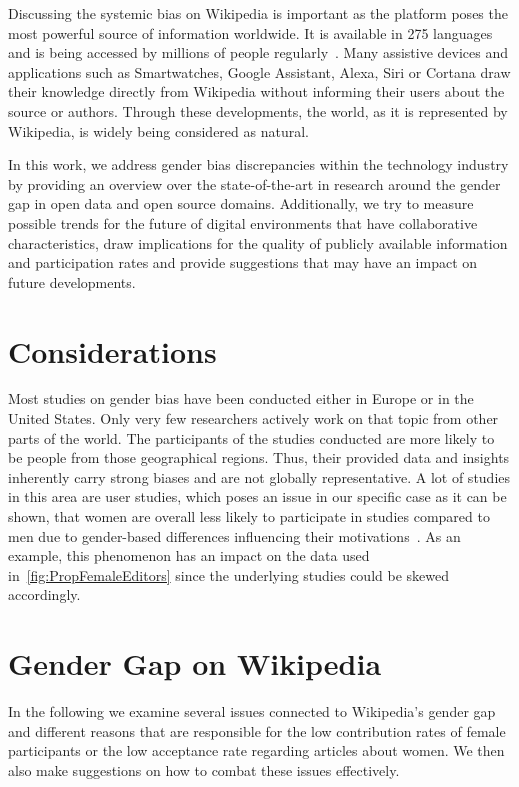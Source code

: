 \documentclass[a4paper, 11pt]{article}
\begin{document}
Discussing the systemic bias on Wikipedia is important as the platform poses the most powerful source of information worldwide. It is available in 275 languages and is being accessed by millions of people regularly~\cite{zachte2018}. Many assistive devices and applications such as Smartwatches, Google Assistant, Alexa, Siri or Cortana draw their knowledge directly from Wikipedia without informing their users about the source or authors. Through these developments, the world, as it is represented by Wikipedia, is widely being considered as natural.

In this work, we address gender bias discrepancies within the technology industry by providing an overview over the state-of-the-art in research around the gender gap in open data and open source domains. Additionally, we try to measure possible trends for the future of digital environments that have collaborative characteristics, draw implications for the quality of publicly available information and participation rates and provide suggestions that may have an impact on future developments.

\section{Considerations} \label{sec:considerations}
Most studies on gender bias have been conducted either in Europe or in the United States. Only very few researchers actively work on that topic from other parts of the world. The participants of the studies conducted are more likely to be people from those geographical regions. Thus, their provided data and insights inherently carry strong biases and are not globally representative. A lot of studies in this area are user studies, which poses an issue in our specific case as it can be shown, that women are overall less likely to participate in studies compared to men due to gender-based differences influencing their motivations~\cite{lobato2014impact}. As an example, this phenomenon has an impact on the data used in~\autoref{fig:PropFemaleEditors} since the underlying studies could be skewed accordingly.

\section{Gender Gap on Wikipedia} \label{sec:gender-gap-wikipedia}
In the following we examine several issues connected to Wikipedia’s gender gap and different reasons that are responsible for the low contribution rates of female participants or the low acceptance rate regarding articles about women. We then also make suggestions on how to combat these issues effectively.
\end{document}
